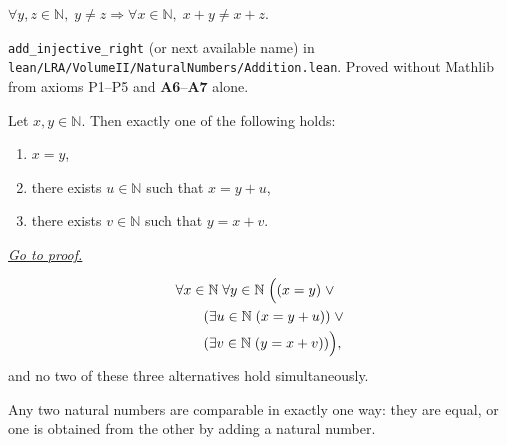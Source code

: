 \begin{remark*}
$\forall y, z \in \mathbb{N},\; y \neq z \Rightarrow \forall x \in \mathbb{N},\;
x + y \neq x + z$.
\end{remark*}

\begin{remark*}[Flash]
\end{remark*}

\begin{remark*}
\texttt{add\_injective\_right} (or next available name) in
\texttt{lean/LRA/VolumeII/NaturalNumbers/Addition.lean}.
Proved without Mathlib from axioms P1--P5 and \textbf{A6}--\textbf{A7} alone.
\end{remark*}



\begin{theorem}
\label{thm:trichotomy-for-natural-numbers}

Let \(x,y\in\mathbb{N}\). Then exactly one of the following holds:
\begin{enumerate}[label=(\arabic*)]
\item \(x=y\),
\item there exists \(u\in\mathbb{N}\) such that \(x=y+u\),
\item there exists \(v\in\mathbb{N}\) such that \(y=x+v\).
\end{enumerate}

\smallskip
\noindent
\hyperref[prf:trichotomy-for-natural-numbers]{\textit{Go to proof.}}
\end{theorem}

\begin{remark*}
\[
\begin{aligned}
&\forall x\in\mathbb{N}\;\forall y\in\mathbb{N}\; \Bigl(
(x=y)\;\lor \\
&\qquad (\exists u\in\mathbb{N}\;(x=y+u))\;\lor \\
&\qquad (\exists v\in\mathbb{N}\;(y=x+v))
\Bigr),
\end{aligned}
\]
and no two of these three alternatives hold simultaneously.
\end{remark*}

\begin{remark*}[Interpretation]
Any two natural numbers are comparable in exactly one way: they are equal, or one is obtained from the other by adding a natural number.
\end{remark*}




